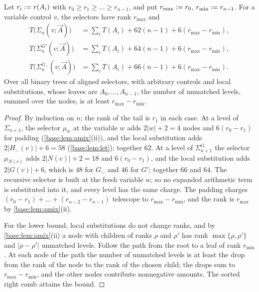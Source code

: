 \begin{theorem}
\label{base:thm:fused-size}
Let $r_i\mathrel{:=} r(A_i)$ with $r_0\ge r_1\ge\dots\ge r_{n-1}$, and put
$r_{\max}\mathrel{:=} r_0$, $r_{\min}\mathrel{:=} r_{n-1}$.  For a variable control $v$,
the selectors have rank $r_{\max}$ and
\begin{align*}
 T\bigl(\Sigma_n(v;\vec A)\bigr)&=\textstyle\sum_iT(A_i)+62(n-1)+6(r_{\max}-r_{\min}),\\
 T\bigl(\Sigma^{G'}_n(v;\vec A)\bigr)&=\textstyle\sum_iT(A_i)+64(n-1)+6(r_{\max}-r_{\min}),\\
 T\bigl(\Sigma^{G_-}_n(v;\vec A)\bigr)&=\textstyle\sum_iT(A_i)+66(n-1)+6(r_{\max}-r_{\min}).
\end{align*}
Over all binary trees of aligned selectors, with arbitrary controls and
local substitutions, whose leaves are $A_0,\dots,A_{n-1}$, the number of
unmatched levels, summed over the nodes, is at least $r_{\max}-r_{\min}$.
\end{theorem}

\begin{proof}
By induction on $n$; the rank of the tail is $r_1$ in each case.  At a level
of $\Sigma_{n+1}$, the selector $\mu_w$ at the variable $w$ adds $2|w|+2=4$
nodes and $6(r_0-r_1)$ for padding (\cref{base:lem:amix}(ii)), and the local
substitution adds $2|H_-(v)|+6=58$ (\cref{base:lem:let}); together $62$.  At
a level of $\Sigma^{G}_{n+1}$ the selector $\mu_{N(v)}$ adds $2|N(v)|+2=18$
and $6(r_0-r_1)$, and the local substitution adds $2|G(v)|+6$, which is
$48$ for $G_-$ and $46$ for $G'$; together $66$ and $64$.  The recursive
selector is built at the fresh variable $w$, so no expanded arithmetic term
is substituted into it, and every level has the same charge.  The padding
charges $(r_0-r_1)+\dots+(r_{n-2}-r_{n-1})$ telescope to
$r_{\max}-r_{\min}$, and the rank is $r_{\max}$ by \cref{base:lem:amix}(ii).

For the lower bound, local substitutions do not change ranks, and by
\cref{base:lem:amix}(ii) a node with children of ranks $\rho$ and $\rho'$
has rank $\max\{\rho,\rho'\}$ and $|\rho-\rho'|$ unmatched levels.  Follow
the path from the root to a leaf of rank $r_{\min}$.  At each node of the
path the number of unmatched levels is at least the drop from the rank of
the node to the rank of the chosen child; the drops sum to
$r_{\max}-r_{\min}$, and the other nodes contribute nonnegative amounts.  The
sorted right comb attains the bound.
\end{proof}

